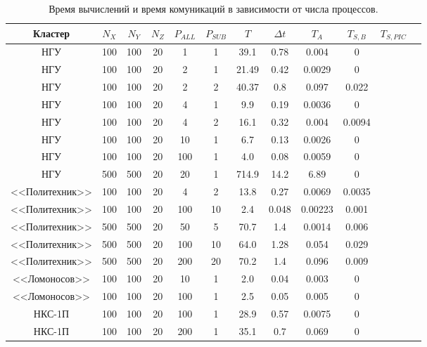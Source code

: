 \begin{table}[ht]
	\begin{center}
		\caption{Время вычислений и время комуникаций в зависимости от числа  процессов.}
		\begin{tabular}{|c|c|c|c|c|c|c|c|c|c|c|c|}
			\hline			
			Кластер & $N_X$ & $N_Y$ & $N_Z$ &$P_{ALL}$  & $P_{SUB}$ & $T$ & $\Delta t$ & $T_{A}$ &  $T_{S,B}$ & $T_{S,PIC}$ \\\hline
			НГУ     & 100   & 100   & 20    &  1        & 1         & 39.1  & 0.78 & 0.004         & 0      &    \\\hline
			НГУ     & 100   & 100   & 20    &  2        & 1         & 21.49 & 0.42 & 0.0029         & 0     &    \\\hline
			НГУ     & 100   & 100   & 20    &  2        & 2         & 40.37 & 0.8 & 0.097         & 0.022   &    \\\hline
			НГУ     & 100   & 100   & 20    &  4        & 1         & 9.9 & 0.19 & 0.0036         & 0       &    \\\hline
			НГУ     & 100   & 100   & 20    &  4        & 2         & 16.1 & 0.32 & 0.004         & 0.0094  &    \\\hline
			НГУ     & 100   & 100   & 20    &  10       & 1         & 6.7 & 0.13 & 0.0026         & 0       &    \\\hline
			НГУ     & 100   & 100   & 20    &  100      & 1         & 4.0   & 0.08 & 0.0059         & 0     &    \\\hline
			НГУ     & 500   & 500   & 20    &  20       & 1         & 714.9 & 14.2 & 6.89         & 0       &    \\\hline
			<<Политехник>> & 100   & 100   & 20    &  4       & 2         & 13.8 & 0.27 & 0.0069  & 0.0035  &    \\\hline
			<<Политехник>> & 100   & 100   & 20    &  100     & 10        & 2.4 & 0.048 & 0.00223 & 0.001   &    \\\hline
			<<Политехник>> & 500   & 500   & 20    &  50       & 5        & 70.7 & 1.4 & 0.0014   & 0.006   &    \\\hline
			<<Политехник>> & 500   & 500   & 20    &  100       & 10      & 64.0 & 1.28 & 0.054   & 0.029   &    \\\hline
			<<Политехник>> & 500   & 500   & 20    &  200       & 20      & 70.2 & 1.4 & 0.096    & 0.009   &    \\\hline
			<<Ломоносов>> & 100   & 100   & 20    &  10       & 1         & 2.0 & 0.04 & 0.003    & 0       &    \\\hline
			<<Ломоносов>> & 100   & 100   & 20    &  100       & 1        & 2.5 & 0.05 & 0.005    & 0       &    \\\hline
			НКС-1П        & 100   & 100   & 20    &  100       & 1        & 28.9 & 0.57 & 0.0075  & 0       &    \\\hline
			НКС-1П        & 100   & 100   & 20    &  200       & 1        & 35.1 & 0.7 & 0.069    & 0       &    \\\hline
			
		\end{tabular}
	\end{center}
	\label{modern_PIC_params}
\end{table}

